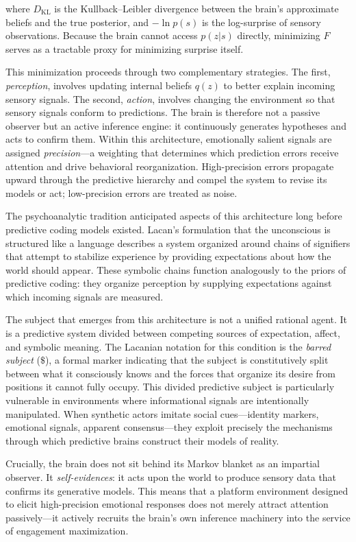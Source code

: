 \documentclass[12pt,a4paper]{article}
\begin{document}
where $D_{\mathrm{KL}}$ is the Kullback--Leibler divergence between the brain's approximate
beliefs and the true posterior, and $-\ln p(s)$ is the log-surprise of sensory observations.
Because the brain cannot access $p(z|s)$ directly, minimizing $F$ serves as a tractable proxy
for minimizing surprise itself.

This minimization proceeds through two complementary strategies. The first, \emph{perception},
involves updating internal beliefs $q(z)$ to better explain incoming sensory signals. The
second, \emph{action}, involves changing the environment so that sensory signals conform to
predictions. The brain is therefore not a passive observer but an active inference engine:
it continuously generates hypotheses and acts to confirm them. Within this architecture,
emotionally salient signals are assigned \emph{precision}---a weighting that determines which
prediction errors receive attention and drive behavioral reorganization. High-precision errors
propagate upward through the predictive hierarchy and compel the system to revise its models
or act; low-precision errors are treated as noise.

The psychoanalytic tradition anticipated aspects of this architecture long before predictive
coding models existed. Lacan's formulation that the unconscious is structured like a language
describes a system organized around chains of signifiers that attempt to stabilize experience
by providing expectations about how the world should appear. These symbolic chains function
analogously to the priors of predictive coding: they organize perception by supplying
expectations against which incoming signals are measured.

The subject that emerges from this architecture is not a unified rational agent. It is a
predictive system divided between competing sources of expectation, affect, and symbolic meaning.
The Lacanian notation for this condition is the \emph{barred subject} ($\$$), a formal marker
indicating that the subject is constitutively split between what it consciously knows and the
forces that organize its desire from positions it cannot fully occupy. This divided predictive
subject is particularly vulnerable in environments where informational signals are intentionally
manipulated. When synthetic actors imitate social cues---identity markers, emotional signals,
apparent consensus---they exploit precisely the mechanisms through which predictive brains
construct their models of reality.

Crucially, the brain does not sit behind its Markov blanket as an impartial observer. It
\emph{self-evidences}: it acts upon the world to produce sensory data that confirms its
generative models. This means that a platform environment designed to elicit high-precision
emotional responses does not merely attract attention passively---it actively recruits the
brain's own inference machinery into the service of engagement maximization.
\end{document}
